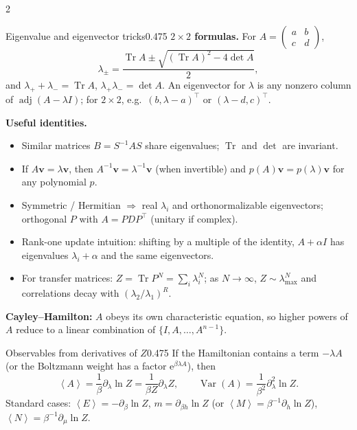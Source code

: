 \documentclass[8pt,a4paper]{extarticle}
\newcommand{\avg}[1]{\left\langle #1\right\rangle}
\newcommand{\Var}{\operatorname{Var}}
\newcommand{\Tr}{\operatorname{Tr}}
\newcommand{\e}{\mathrm e}
\begin{document}
\begin{multicols*}{2}
\begin{mytikzbox}{Eigenvalue and eigenvector tricks}{0.475}
\textbf{$2\times2$ formulas.} For
$A=\begin{pmatrix}a&b\\c&d\end{pmatrix}$,
\[
\lambda_\pm=\frac{\Tr A\pm\sqrt{(\Tr A)^2-4\det A}}{2},
\]
and $\lambda_++\lambda_-=\Tr A$, $\lambda_+\lambda_-=\det A$.
An eigenvector for $\lambda$ is any nonzero column of $\operatorname{adj}(A-\lambda I)$;
for $2\times2$, e.g.\ $(b,\lambda-a)^\top$ or $(\lambda-d,c)^\top$.

\textbf{Useful identities.}
\begin{itemize}
\item Similar matrices $B=S^{-1}AS$ share eigenvalues; $\Tr$ and $\det$ are invariant.
\item If $A\mathbf v=\lambda\mathbf v$, then $A^{-1}\mathbf v=\lambda^{-1}\mathbf v$
(when invertible) and $p(A)\mathbf v=p(\lambda)\mathbf v$ for any polynomial $p$.
\item Symmetric / Hermitian $\Rightarrow$ real $\lambda_i$ and orthonormalizable
eigenvectors; orthogonal $P$ with $A=P D P^\top$ (unitary if complex).
\item Rank-one update intuition: shifting by a multiple of the identity,
$A+\alpha I$ has eigenvalues $\lambda_i+\alpha$ and the same eigenvectors.
\item For transfer matrices: $Z=\Tr P^N=\sum_i\lambda_i^N$; as $N\to\infty$,
$Z\sim\lambda_{\max}^N$ and correlations decay with
$(\lambda_2/\lambda_1)^R$.
\end{itemize}
\textbf{Cayley--Hamilton:} $A$ obeys its own characteristic equation, so
higher powers of $A$ reduce to a linear combination of $\{I,A,\ldots,A^{n-1}\}$.
\end{mytikzbox}

\begin{mytikzbox}{Observables from derivatives of $Z$}{0.475}
If the Hamiltonian contains a term $-\lambda A$ (or the Boltzmann weight has a
factor $\e^{\beta\lambda A}$), then
\[
\avg A=\frac1{\beta}\partial_\lambda\ln Z
=\frac1{\beta Z}\partial_\lambda Z,
\qquad
\Var(A)=\frac1{\beta^2}\partial_\lambda^2\ln Z.
\]
Standard cases: $\avg E=-\partial_\beta\ln Z$,
$m=\partial_{\beta h}\ln Z$ (or $\avg M=\beta^{-1}\partial_h\ln Z$),
$\avg N=\beta^{-1}\partial_\mu\ln Z$.


\end{mytikzbox}
\end{multicols*}
\end{document}
